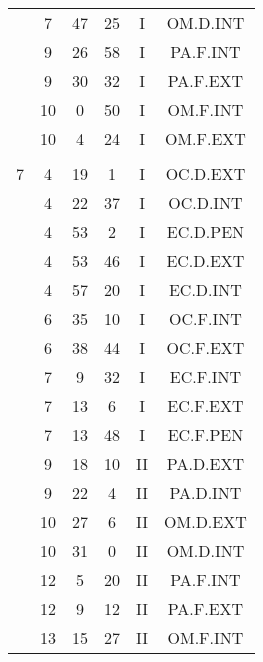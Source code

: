 \documentclass[12pt, a4paper]{article}
\begin{document}
\begin{multicols}{3}
{\begin{tabular}{c c c c c c}
	 	 	 	 & 7 & 47 & 25 & I & OM.D.INT\\%
	 	 	 	 & 9 & 26 & 58 & I & PA.F.INT\\%
	 	 	 	 & 9 & 30 & 32 & I & PA.F.EXT\\%
	 	 	 	 & 10 & 0 & 50 & I & OM.F.INT\\%
	 	 	 	 & 10 & 4 & 24 & I & OM.F.EXT\\%
	 	 	 	 & & & & & \\%
	 	 	 	7 & 4 & 19 & 1 & I & OC.D.EXT\\%
	 	 	 	 & 4 & 22 & 37 & I & OC.D.INT\\%
	 	 	 	 & 4 & 53 & 2 & I & EC.D.PEN\\%
	 	 	 	 & 4 & 53 & 46 & I & EC.D.EXT\\%
	 	 	 	 & 4 & 57 & 20 & I & EC.D.INT\\%
	 	 	 	 & 6 & 35 & 10 & I & OC.F.INT\\%
	 	 	 	 & 6 & 38 & 44 & I & OC.F.EXT\\%
	 	 	 	 & 7 & 9 & 32 & I & EC.F.INT\\%
	 	 	 	 & 7 & 13 & 6 & I & EC.F.EXT\\%
	 	 	 	 & 7 & 13 & 48 & I & EC.F.PEN\\%
	 	 	 	 & 9 & 18 & 10 & II & PA.D.EXT\\%
	 	 	 	 & 9 & 22 & 4 & II & PA.D.INT\\%
	 	 	 	 & 10 & 27 & 6 & II & OM.D.EXT\\%
	 	 	 	 & 10 & 31 & 0 & II & OM.D.INT\\%
	 	 	 	 & 12 & 5 & 20 & II & PA.F.INT\\%
	 	 	 	 & 12 & 9 & 12 & II & PA.F.EXT\\%
	 	 	 	 & 13 & 15 & 27 & II & OM.F.INT\\%

\end{tabular}}
\end{multicols}
\end{document}
